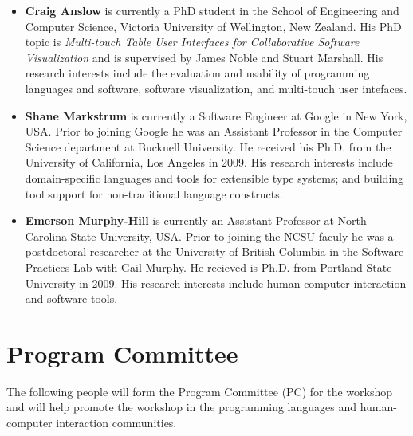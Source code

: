 \documentclass{sigplanconf}
\begin{document}
\begin{itemize}
\item \textbf{Craig Anslow} is currently a PhD student in the School of
  Engineering and Computer Science, Victoria University of Wellington,
  New Zealand. His PhD topic is \emph{Multi-touch Table User
    Interfaces for Collaborative Software Visualization} and is
  supervised by James Noble and Stuart Marshall. His research interests include the evaluation and usability of programming languages and software, software visualization, and multi-touch user intefaces.

\item \textbf{Shane Markstrum} is currently a Software Engineer at Google in New York, USA. Prior to joining Google he was an Assistant Professor in the Computer Science
  department at Bucknell University. He received his Ph.D. from the University of
  California, Los Angeles in 2009. His research interests include
  domain-specific languages and tools for extensible type systems; and 
  building tool support for non-traditional language constructs.
  
\item \textbf{Emerson Murphy-Hill} is currently an Assistant Professor at North Carolina State University, USA. Prior to joining the NCSU faculy he was a postdoctoral researcher at the University of British Columbia in the Software Practices Lab with Gail Murphy. 
  He recieved is Ph.D. from Portland State University in 2009.
  His research interests include human-computer interaction and software tools. 
\end{itemize}

\section{Program Committee}

The following people will form the Program Committee (PC) for the workshop and will help promote the workshop in the programming languages and human-computer interaction communities.
\end{document}
